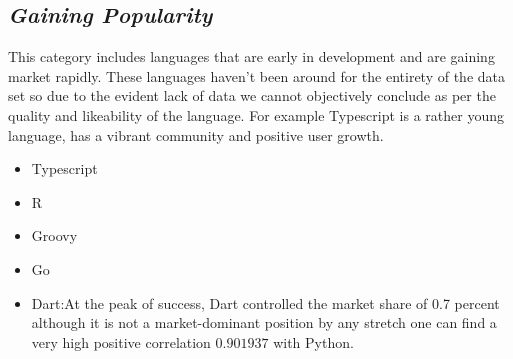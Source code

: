 \documentclass[conference]{IEEEtran}
\begin{document}
\subsection{\textit{Gaining Popularity}}
This category includes languages that are early in development and are gaining market rapidly.
These languages haven't been around for the entirety of the data set so due to the evident lack of data we cannot objectively conclude as per the quality and likeability of the language. For example Typescript is a rather young language, has a vibrant community and positive user growth.

\begin{itemize}
\item{Typescript}
\item{R}
\item{Groovy}
\item{Go}
\item{Dart}:At the peak of success, Dart controlled the market share of 0.7 percent although it is not a market-dominant position by any stretch one can find a very high positive correlation \(0.901937\) with Python. 
\end{itemize}
\end{document}
